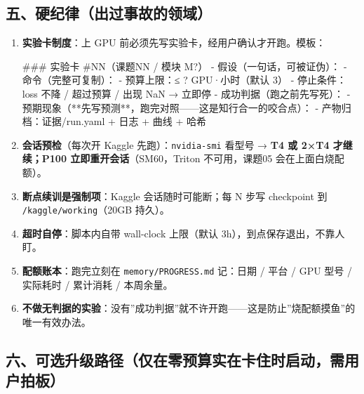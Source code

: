 \documentclass[
  chinese,
  11pt,
]{ctexart}
\newenvironment{Shaded}{}{}
\newcommand{\FunctionTok}[1]{\textcolor[rgb]{0.02,0.16,0.49}{#1}}
\newcommand{\NormalTok}[1]{#1}
\newcommand{\SpecialStringTok}[1]{\textcolor[rgb]{0.73,0.40,0.53}{#1}}
\begin{document}
\subsection{五、硬纪律（出过事故的领域）}\label{ux4e94ux786cux7eaaux5f8bux51faux8fc7ux4e8bux6545ux7684ux9886ux57df}

\begin{enumerate}
\def\labelenumi{\arabic{enumi}.}
\item
  \textbf{实验卡制度}：上 GPU 前必须先写实验卡，经用户确认才开跑。模板：

\begin{Shaded}
\begin{Highlighting}[]
\FunctionTok{\#\#\# 实验卡 \#NN（课题NN / 模块 M?）}
\SpecialStringTok{{-} }\NormalTok{假设（一句话，可被证伪）：}
\SpecialStringTok{{-} }\NormalTok{命令（完整可复制）：}
\SpecialStringTok{{-} }\NormalTok{预算上限：≤ ? GPU·小时（默认 3）}
\SpecialStringTok{{-} }\NormalTok{停止条件：loss 不降 / 超过预算 / 出现 NaN → 立即停}
\SpecialStringTok{{-} }\NormalTok{成功判据（跑之前先写死）：}
\SpecialStringTok{{-} }\NormalTok{预期现象（**先写预测**，跑完对照——这是知行合一的咬合点）：}
\SpecialStringTok{{-} }\NormalTok{产物归档：证据/run.yaml + 日志 + 曲线 + 哈希}
\end{Highlighting}
\end{Shaded}
\item
  \textbf{会话预检}（每次开 Kaggle 先跑）：\texttt{nvidia-smi} 看型号 → \textbf{T4 或 2×T4 才继续；P100 立即重开会话}（SM60，Triton 不可用，课题05 会在上面白烧配额）。
\item
  \textbf{断点续训是强制项}：Kaggle 会话随时可能断；每 N 步写 checkpoint 到 \texttt{/kaggle/working}（20GB 持久）。
\item
  \textbf{超时自停}：脚本内自带 wall-clock 上限（默认 3h），到点保存退出，不靠人盯。
\item
  \textbf{配额账本}：跑完立刻在 \texttt{memory/PROGRESS.md} 记：日期 / 平台 / GPU 型号 / 实际耗时 / 累计消耗 / 本周余量。
\item
  \textbf{不做无判据的实验}：没有''成功判据''就不许开跑------这是防止''烧配额摸鱼''的唯一有效办法。
\end{enumerate}

\subsection{六、可选升级路径（仅在零预算实在卡住时启动，需用户拍板）}\label{ux516dux53efux9009ux5347ux7ea7ux8defux5f84ux4ec5ux5728ux96f6ux9884ux7b97ux5b9eux5728ux5361ux4f4fux65f6ux542fux52a8ux9700ux7528ux6237ux62cdux677f}
\end{document}
